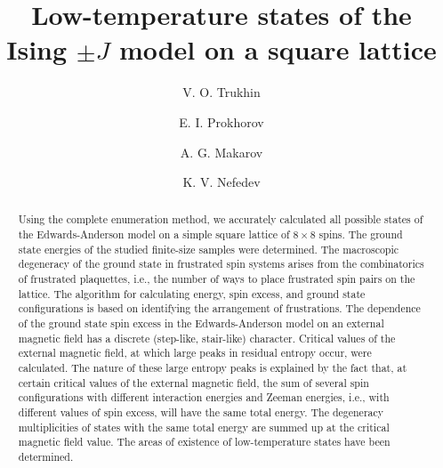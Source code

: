 \documentclass[preprint,12pt]{elsarticle}
\begin{document}
	
	\begin{frontmatter}
		
		
		\title{Low-temperature states of the Ising $\pm J$ model on a square lattice}
		
		\author[FEFU,IPM]{V. O. Trukhin}
		\author[FEFU]{E. I. Prokhorov}
		\author[FEFU,IPM]{A. G. Makarov}
		\author[FEFU,IPM]{K. V. Nefedev}
		
		\begin{abstract}
			
			Using the complete enumeration method, we accurately calculated all possible states of the Edwards-Anderson model on a simple square lattice of $8 \times 8$ spins. The ground state energies of the studied finite-size samples were determined. The macroscopic degeneracy of the ground state in frustrated spin systems arises from the combinatorics of frustrated plaquettes, i.e., the number of ways to place frustrated spin pairs on the lattice. The algorithm for calculating energy, spin excess, and ground state configurations is based on identifying the arrangement of frustrations. The dependence of the ground state spin excess in the Edwards-Anderson model on an external magnetic field has a discrete (step-like, stair-like) character. Critical values of the external magnetic field, at which large peaks in residual entropy occur, were calculated. The nature of these large entropy peaks is explained by the fact that, at certain critical values of the external magnetic field, the sum of several spin configurations with different interaction energies and Zeeman energies, i.e., with different values of spin excess, will have the same total energy. The degeneracy multiplicities of states with the same total energy are summed up at the critical magnetic field value. The areas of existence of low-temperature states have been determined.
			

\end{abstract}
\end{frontmatter}
\end{document}
